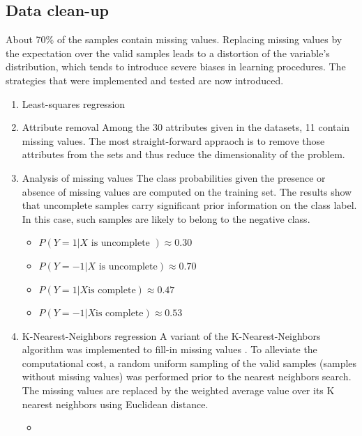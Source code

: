 \documentclass[10pt,conference,compsocconf]{IEEEtran}
\begin{document}
\subsection{Data clean-up}
\label{sec:orgheadline6}
About 70\% of the samples contain missing values. Replacing missing values by the expectation over the valid samples leads to a distortion of the variable's distribution, which tends to introduce severe biases in learning procedures. The strategies that were implemented and tested are now introduced.
\begin{enumerate}
\item Least-squares regression
\label{sec:orgheadline2}
\item Attribute removal
\label{sec:orgheadline3}
Among the 30 attributes given in the datasets, 11 contain missing values. The most straight-forward appraoch is to remove those attributes from the sets and thus reduce the dimensionality of the problem.

\item Analysis of missing values
\label{sec:orgheadline4}
The class probabilities given the presence or absence of missing values are computed on the training set. The results show that uncomplete samples carry significant prior information on the class label. In this case, such samples are likely to belong to the negative class.
\begin{itemize}
\item \(P(Y=1|X \text{ is uncomplete }) \approx 0.30\)
\item \(P(Y=-1|X \text{ is uncomplete}) \approx 0.70\)
\item \(P(Y=1|X \text{is complete}) \approx 0.47\)
\item \(P(Y=-1|X \text{is complete}) \approx 0.53\)
\end{itemize}
\item K-Nearest-Neighbors regression
\label{sec:orgheadline5}
A variant of the K-Nearest-Neighbors algorithm was implemented to fill-in missing values \cite{malarvizhi12}. To alleviate the computational cost, a random uniform sampling of the valid samples (samples without missing values) was performed prior to the nearest neighbors search.
The missing values are replaced by the weighted average value over its K nearest neighbors using Euclidean distance. 

\begin{itemize}
\item 
\end{itemize}
\end{enumerate}
\end{document}
